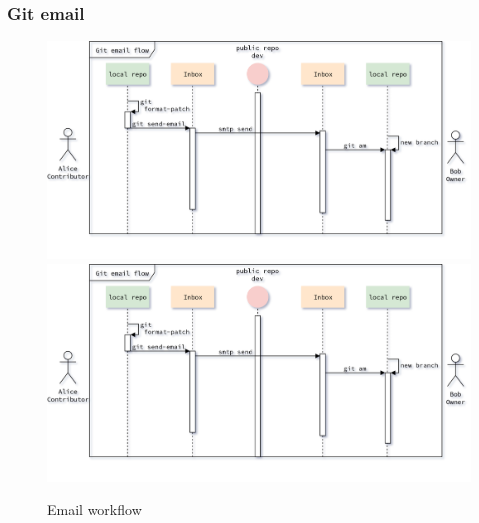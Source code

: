 \begin{frame}
    \frametitle{Git email}
    \begin{figure}
        \begin{center}
            {
                \includegraphics[height=0.7\textheight,keepaspectratio]{./images/EmailWorkflow_ApplyAndTest.png}
            }
            {
                \includegraphics[height=0.75\textheight,keepaspectratio]{./images/EmailWorkflow_ApplyAndTest.png}
            }
            \caption{Email workflow}
        \end{center}
    \end{figure}
\end{frame}


